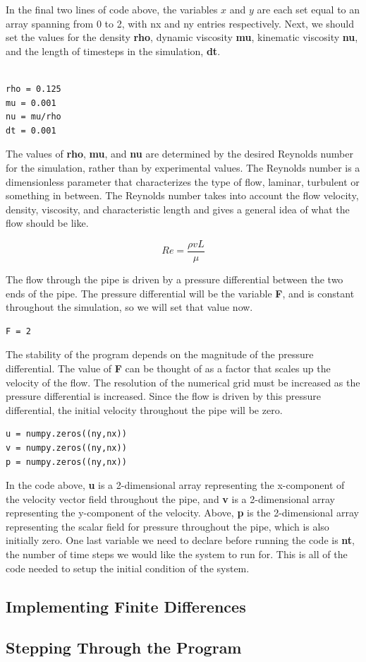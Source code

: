 \documentclass[twocolumn,12pth]{article}
\begin{document}
In the final two lines of code above, the variables $x$ and $y$ are each set equal to an array spanning from 0 to 2, with nx and ny entries respectively. Next, we should set the values for the density \textbf{rho}, dynamic viscosity \textbf{mu}, kinematic viscosity \textbf{nu}, and the length of timesteps in the simulation, \textbf{dt}.

\begin{lstlisting}

rho = 0.125
mu = 0.001
nu = mu/rho
dt = 0.001

\end{lstlisting}

The values of \textbf{rho}, \textbf{mu}, and \textbf{nu} are determined by the desired Reynolds number for the simulation, rather than by experimental values.
The Reynolds number is a dimensionless parameter that characterizes the type of flow, laminar, turbulent or something in between.
The Reynolds number takes into account the flow velocity, density, viscosity, and characteristic length and gives a general idea of what the flow should be like.

\begin{equation}
Re = \frac{\rho{v}{L}}{\mu}
\end{equation}

The flow through the pipe is driven by a pressure differential between the two ends of the pipe.
The pressure differential will be the variable \textbf{F}, and is constant throughout the simulation, so we will set that value now.

\begin{lstlisting}
F = 2
\end{lstlisting}

The stability of the program depends on the magnitude of the pressure differential.
The value of \textbf{F} can be thought of as a factor that scales up the velocity of the flow.
The resolution of the numerical grid must be increased as the pressure differential is increased.
Since the flow is driven by this pressure differential, the initial velocity throughout the pipe will be zero.

\begin{lstlisting}
u = numpy.zeros((ny,nx))
v = numpy.zeros((ny,nx))
p = numpy.zeros((ny,nx))
\end{lstlisting}

In the code above, \textbf{u} is a 2-dimensional array representing the x-component of the velocity vector field throughout the pipe, and \textbf{v} is a 2-dimensional array representing the y-component of the velocity.
Above, \textbf{p} is the 2-dimensional array representing the scalar field for pressure throughout the pipe, which is also initially zero.
One last variable we need to declare before running the code is \textbf{nt}, the number of time steps we would like the system to run for.
This is all of the code needed to setup the initial condition of the system.

\subsection{Implementing Finite Differences}

\subsection{Stepping Through the Program}
\end{document}
